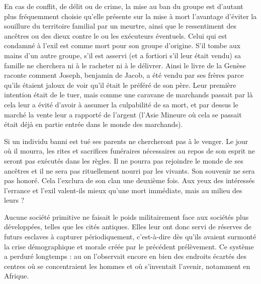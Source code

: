 En cas de conflit, de délit ou de crime, la mise au ban du groupe 
est d'autant plus fréquemment choisie qu'elle présente sur la mise à mort 
l'avantage d'éviter la souillure du territoire familial par un meurtre, ainsi 
que le ressentiment des ancêtres ou des dieux contre le ou les exécuteurs 
éventuels. Celui qui est condamné à l'exil est comme mort pour son 
groupe d'origine. S'il tombe aux mains d'un autre groupe, s'il est asservi 
(et a fortiori s'il leur était vendu) sa famille ne cherchera ni à le racheter 
ni à le délivrer. Ainsi le livre de la Genèse raconte comment Joseph,
benjamin de Jacob, a été vendu par ses frères parce qu'ils étaient jaloux de 
voir qu'il était le préféré de son père. Leur première intention était de le 
tuer, mais comme une caravane de marchands passait par là cela leur a 
évité d'avoir à assumer la culpabilité de sa mort, et par dessus le marché 
la vente leur a rapporté de l'argent (l'Asie Mineure où cela se passait était 
déjà en partie entrée dans le monde des marchands).

Si un individu banni est tué ses parents ne chercheront pas à le 
venger. Le jour où il mourra, les rites et sacrifices funéraires nécessaires 
au repos de son esprit ne seront pas exécutés dans les règles. Il ne pourra 
pas rejoindre le monde de ses ancêtres et il ne sera pas rituellement
nourri par les vivants. Son souvenir ne sera pas honoré. Cela l'exclura de son 
clan une deuxième fois. Aux yeux des intéressés l'errance et l'exil
valent-ils mieux qu'une mort immédiate, mais au milieu des leurs ?

Aucune société primitive ne faisait le poids militairement face 
aux sociétés plus développées, telles que les cités antiques. Elles leur 
ont donc servi de réserves de futurs esclaves à capturer périodiquement, c'est-à-dire dès 
qu'ils avaient surmonté la crise démographique et morale créée par le précédent prélèvement. Ce 
système a perduré longtemps : au  on l'observait encore
en bien des endroits écartés des centres où se concentraient les hommes 
et où s'inventait l'avenir, notamment en Afrique.



